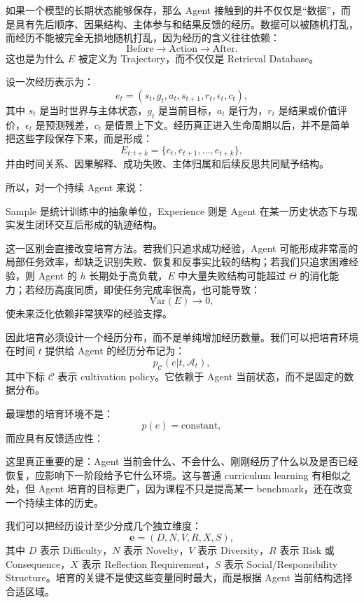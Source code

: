 如果一个模型的长期状态能够保存，那么 Agent 接触到的并不仅仅是“数据”，而是具有先后顺序、因果结构、主体参与和结果反馈的经历。数据可以被随机打乱，而经历不能被完全无损地随机打乱，因为经历的含义往往依赖：
\[
\text{Before}
\rightarrow
\text{Action}
\rightarrow
\text{After}.
\]
这也是为什么 $E$ 被定义为 Trajectory，而不仅仅是 Retrieval Database。

设一次经历表示为：
\[
e_t
=
(
s_t,
g_t,
a_t,
s_{t+1},
r_t,
\epsilon_t,
c_t
),
\]
其中 $s_t$ 是当时世界与主体状态，$g_t$ 是当前目标，$a_t$ 是行为，$r_t$ 是结果或价值评价，$\epsilon_t$ 是预测残差，$c_t$ 是情景上下文。经历真正进入生命周期以后，并不是简单把这些字段保存下来，而是形成：
\[
E_{t:t+k}
=
\{e_t,e_{t+1},\ldots,e_{t+k}\},
\]
并由时间关系、因果解释、成功失败、主体归属和后续反思共同赋予结构。

所以，对一个持续 Agent 来说：
\begin{statementbox}
\centering
{}
\end{statementbox}
Sample 是统计训练中的抽象单位，Experience 则是 Agent 在某一历史状态下与现实发生闭环交互后形成的轨迹结构。

这一区别会直接改变培育方法。若我们只追求成功经验，Agent 可能形成非常高的局部任务效率，却缺乏识别失败、恢复和反事实比较的结构；若我们只追求困难经验，则 Agent 的 $h$ 长期处于高负载，$E$ 中大量失败结构可能超过 $\Theta$ 的消化能力；若经历高度同质，即使任务完成率很高，也可能导致：
\[
\mathrm{Var}(E)\rightarrow0,
\]
使未来泛化依赖非常狭窄的经验支撑。

因此培育必须设计一个经历分布，而不是单纯增加经历数量。我们可以把培育环境在时间 $t$ 提供给 Agent 的经历分布记为：
\[
p_{\mathcal C}(e|t,\mathcal A_t),
\]
其中下标 $\mathcal C$ 表示 cultivation policy。它依赖于 Agent 当前状态，而不是固定的数据分布。

最理想的培育环境不是：
\[
p(e)=\mathrm{constant},
\]
而应具有反馈适应性：
\begin{statementbox}
\centering
{}
\end{statementbox}

这里真正重要的是：Agent 当前会什么、不会什么、刚刚经历了什么以及是否已经恢复，应影响下一阶段给予它什么环境。这与普通 curriculum learning 有相似之处，但 Agent 培育的目标更广，因为课程不只是提高某一 benchmark，还在改变一个持续主体的历史。

我们可以把经历设计至少分成几个独立维度：
\[
\mathbf e
=
(D,N,V,R,X,S),
\]
其中 $D$ 表示 Difficulty，$N$ 表示 Novelty，$V$ 表示 Diversity，$R$ 表示 Risk 或 Consequence，$X$ 表示 Reflection Requirement，$S$ 表示 Social/Responsibility Structure。培育的关键不是使这些变量同时最大，而是根据 Agent 当前结构选择合适区域。

